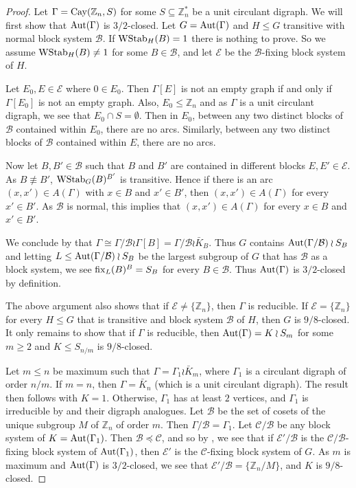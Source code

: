 \documentclass{amsart}
\theoremstyle{definition}
\theoremstyle{remark}
\numberwithin{equation}{section}
\def\Z{{\mathbb Z}}
\def\fix{{\rm fix}}
\def\Aut{{\rm Aut}}
\def\cal{\mathcal}
\def\WStab{{\rm WStab}}
\def\Cay{{\rm Cay}}
\begin{document}
\begin{proof}
Let $\Gamma = \Cay(\Z_n,S)$ for some $S\subseteq\Z_n^*$ be a unit circulant digraph.  We will first show that $\Aut(\Gamma)$ is $3/2$-closed.  Let $G = \Aut(\Gamma)$ and $H\le G$ transitive with normal block system ${\cal B}$.  If $\WStab_H(B) = 1$ there is nothing to prove.  So we assume $\WStab_H(B)\not = 1$ for some $B\in{\cal B}$, and let ${\cal E}$ be the ${\cal B}$-fixing block system of $H$.

Let $E_0, E\in {\cal E}$ where $0\in E_0$.  Then $\Gamma[E]$ is not an empty graph if and only if $\Gamma[E_0]$ is not an empty graph.  Also, $E_0\le\Z_n$ and as $\Gamma$ is a unit circulant digraph, we see that $E_0\cap S = \emptyset$.  Then in $E_0$, between any two distinct blocks of ${\cal B}$ contained within $E_0$, there are no arcs.  Similarly, between any two distinct blocks of ${\cal B}$ contained within $E$, there are no arcs.

Now let $B,B'\in{\cal B}$ such that $B$ and $B'$ are contained in different blocks $E,E'\in{\cal E}$.  As $B\not\equiv B'$,  $\WStab_G(B)^{B'}$ is transitive.  Hence if there is an arc $(x,x')\in A(\Gamma)$ with $x\in B$ and $x'\in B'$, then $(x,x')\in A(\Gamma)$ for every $x'\in B'$.  As ${\cal B}$ is normal, this implies that $(x,x')\in A(\Gamma)$ for every $x\in B$ and $x'\in B'$.

We conclude by \cite[Theorem 4.2.15]{Book} that $\Gamma\cong \Gamma/{\cal B}\wr\Gamma[B] = \Gamma/{\cal B}\wr\bar{K}_B$.  Thus $G$ contains $\Aut(\Gamma/{\cal B})\wr S_B$ and letting $L\le\Aut(\Gamma/{\cal B})\wr S_B$ be the largest subgroup of $G$ that has ${\cal B}$ as a block system, we see $\fix_L(B)^B = S_B$ for every $B\in{\cal B}$.  Thus $\Aut(\Gamma)$ is $3/2$-closed by definition.

The above argument also shows that if ${\cal E}\not = \{\Z_n\}$, then $\Gamma$ is reducible.  If ${\cal E} = \{\Z_n\}$ for every $H\le G$ that is transitive and block system ${\cal B}$ of $H$, then $G$ is $9/8$-closed.  It only remains to show that if $\Gamma$ is reducible, then $\Aut(\Gamma) = K\wr S_m$ for some $m\ge 2$ and $K\le S_{n/m}$ is $9/8$-closed.

Let $m\le n$ be maximum such that $\Gamma = \Gamma_1\wr\bar{K}_m$, where $\Gamma_1$ is a circulant digraph of order $n/m$.  If $m = n$, then $\Gamma = \bar{K}_n$ (which is a unit circulant digraph).  The result then follows with $K = 1$.  Otherwise, $\Gamma_1$ has at least $2$ vertices, and $\Gamma_1$ is irreducible by \cite[Lemma 1 (ii) and (iii)]{Sabidussi1964} and their digraph analogues.  Let ${\cal B}$ be the set of cosets of the unique subgroup $M$ of $\Z_n$ of order $m$.  Then $\Gamma/{\cal B} = \Gamma_1$.  Let ${\cal C}/{\cal B}$ be any block system of $K = \Aut(\Gamma_1)$.  Then ${\cal B}\preceq{\cal C}$, and so by \cite[Lemma 2.2]{Dobson2023apreprint}, we see that if ${\cal E'}/{\cal B}$ is the ${\cal C}/{\cal B}$-fixing block system of $\Aut(\Gamma_1)$, then ${\cal E}'$ is the ${\cal C}$-fixing block system of $G$.  As $m$ is maximum and $\Aut(\Gamma)$ is $3/2$-closed, we see that ${\cal E}'/{\cal B} = \{\Z_n/M\}$, and $K$ is $9/8$-closed.
\end{proof}
\end{document}
